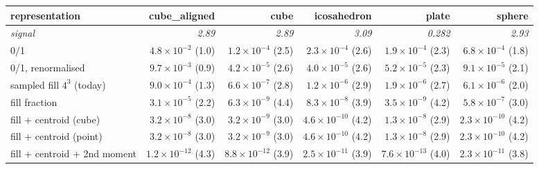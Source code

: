 \begin{tabular}{lrrrrr}
\toprule
representation & cube\_aligned & cube & icosahedron & plate & sphere \\
\midrule
\textit{signal} & \textit{2.89} & \textit{2.89} & \textit{3.09} & \textit{0.282} & \textit{2.93} \\
0/1 & $4.8\times10^{-2}$ (1.0) & $1.2\times10^{-4}$ (2.5) & $2.3\times10^{-4}$ (2.6) & $1.9\times10^{-4}$ (2.3) & $6.8\times10^{-4}$ (1.8) \\
0/1, renormalised & $9.7\times10^{-3}$ (0.9) & $4.2\times10^{-5}$ (2.6) & $4.0\times10^{-5}$ (2.6) & $5.2\times10^{-5}$ (2.3) & $9.1\times10^{-5}$ (2.1) \\
sampled fill $4^3$ (today) & $9.0\times10^{-4}$ (1.3) & $6.6\times10^{-7}$ (2.8) & $1.2\times10^{-6}$ (2.9) & $1.9\times10^{-6}$ (2.7) & $6.1\times10^{-6}$ (2.0) \\
fill fraction & $3.1\times10^{-5}$ (2.2) & $6.3\times10^{-9}$ (4.4) & $8.3\times10^{-8}$ (3.9) & $3.5\times10^{-9}$ (4.2) & $5.8\times10^{-7}$ (3.0) \\
fill + centroid (cube) & $3.2\times10^{-8}$ (3.0) & $3.2\times10^{-9}$ (3.0) & $4.6\times10^{-10}$ (4.2) & $1.3\times10^{-8}$ (2.9) & $2.3\times10^{-10}$ (4.2) \\
fill + centroid (point) & $3.2\times10^{-8}$ (3.0) & $3.2\times10^{-9}$ (3.0) & $4.6\times10^{-10}$ (4.2) & $1.3\times10^{-8}$ (2.9) & $2.3\times10^{-10}$ (4.2) \\
fill + centroid + 2nd moment & $1.2\times10^{-12}$ (4.3) & $8.8\times10^{-12}$ (3.9) & $2.5\times10^{-11}$ (3.9) & $7.6\times10^{-13}$ (4.0) & $2.3\times10^{-11}$ (3.8) \\
\bottomrule
\end{tabular}
